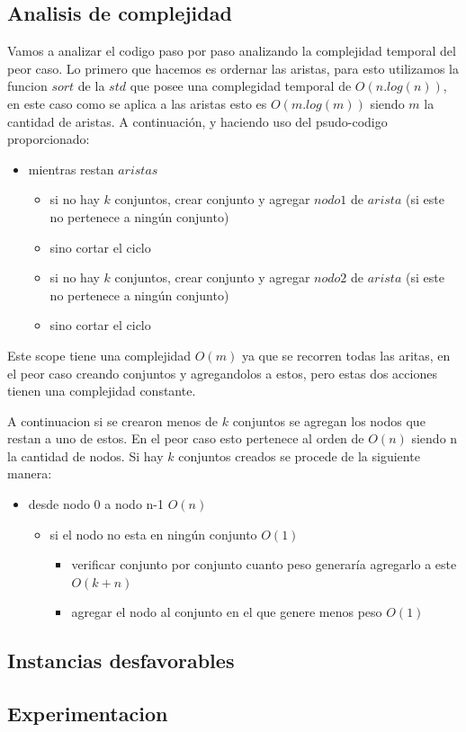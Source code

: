 \subsection{Analisis de complejidad}

Vamos a analizar el codigo paso por paso analizando la complejidad temporal del peor caso.
Lo primero que hacemos es ordernar las aristas, para esto utilizamos la funcion $sort$ de la $std$ que posee una complegidad temporal de $O(n.log(n))$, en este caso como se aplica a las aristas esto es $O(m.log(m))$ siendo $m$ la cantidad de aristas.
A continuación, y haciendo uso del psudo-codigo proporcionado:
\begin{itemize}
\item mientras restan $aristas$ 
  \begin{itemize}
  \item si no hay $k$ conjuntos, crear conjunto y agregar $nodo1$ de $arista$ (si este no pertenece a ningún conjunto)
  \item sino cortar el ciclo  
  \item si no hay $k$ conjuntos, crear conjunto y agregar $nodo2$ de $arista$ (si este no pertenece a ningún conjunto)
  \item sino cortar el ciclo  
  \end{itemize}
\end{itemize}
Este scope tiene una complejidad $O(m)$ ya que se recorren todas las aritas, en el peor caso creando conjuntos y agregandolos a estos, pero estas dos acciones tienen una complejidad constante.

A continuacion si se crearon menos de $k$ conjuntos se agregan los nodos que restan a uno de estos. En el peor caso esto pertenece al orden de $O(n)$ siendo n la cantidad de nodos.
Si hay $k$ conjuntos creados se procede de la siguiente manera:
\begin{itemize}
\item desde nodo 0 a nodo n-1   $O(n)$
  \begin{itemize}
  \item si el nodo no esta en ningún conjunto $O(1)$
    \begin{itemize}
      \item verificar conjunto por conjunto cuanto peso generaría agregarlo a este $O(k+n)$
      \item agregar el nodo al conjunto en el que genere menos peso $O(1)$
    \end{itemize}
  \end{itemize}
\end{itemize}



\subsection{Instancias desfavorables}


\subsection{Experimentacion}


